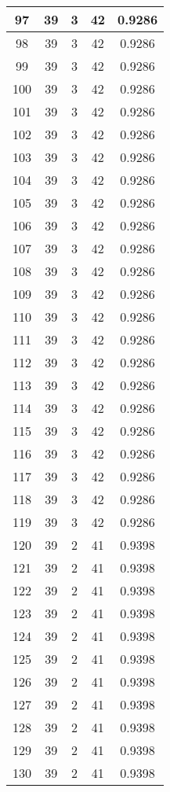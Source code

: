 \documentclass[letterpaper, 12pt]{article}
\begin{document}
\begin{longtable}{|c|c|c|c|c|}
\hline
97 & 39 & 3 & 42 & 0.9286 \\
\hline
98 & 39 & 3 & 42 & 0.9286 \\
\hline
99 & 39 & 3 & 42 & 0.9286 \\
\hline
100 & 39 & 3 & 42 & 0.9286 \\
\hline
101 & 39 & 3 & 42 & 0.9286 \\
\hline
102 & 39 & 3 & 42 & 0.9286 \\
\hline
103 & 39 & 3 & 42 & 0.9286 \\
\hline
104 & 39 & 3 & 42 & 0.9286 \\
\hline
105 & 39 & 3 & 42 & 0.9286 \\
\hline
106 & 39 & 3 & 42 & 0.9286 \\
\hline
107 & 39 & 3 & 42 & 0.9286 \\
\hline
108 & 39 & 3 & 42 & 0.9286 \\
\hline
109 & 39 & 3 & 42 & 0.9286 \\
\hline
110 & 39 & 3 & 42 & 0.9286 \\
\hline
111 & 39 & 3 & 42 & 0.9286 \\
\hline
112 & 39 & 3 & 42 & 0.9286 \\
\hline
113 & 39 & 3 & 42 & 0.9286 \\
\hline
114 & 39 & 3 & 42 & 0.9286 \\
\hline
115 & 39 & 3 & 42 & 0.9286 \\
\hline
116 & 39 & 3 & 42 & 0.9286 \\
\hline
117 & 39 & 3 & 42 & 0.9286 \\
\hline
118 & 39 & 3 & 42 & 0.9286 \\
\hline
119 & 39 & 3 & 42 & 0.9286 \\
\hline
120 & 39 & 2 & 41 & 0.9398 \\
\hline
121 & 39 & 2 & 41 & 0.9398 \\
\hline
122 & 39 & 2 & 41 & 0.9398 \\
\hline
123 & 39 & 2 & 41 & 0.9398 \\
\hline
124 & 39 & 2 & 41 & 0.9398 \\
\hline
125 & 39 & 2 & 41 & 0.9398 \\
\hline
126 & 39 & 2 & 41 & 0.9398 \\
\hline
127 & 39 & 2 & 41 & 0.9398 \\
\hline
128 & 39 & 2 & 41 & 0.9398 \\
\hline
129 & 39 & 2 & 41 & 0.9398 \\
\hline
130 & 39 & 2 & 41 & 0.9398 \\

\end{longtable}
\end{document}
